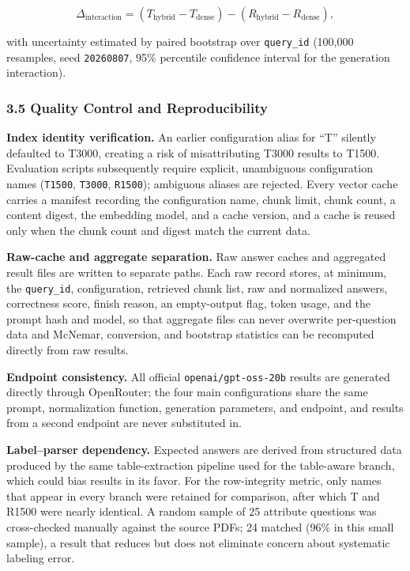\documentclass[11pt,a4paper]{article}
\begin{document}
\[
\Delta_{\text{interaction}}=
(T_{\text{hybrid}}-T_{\text{dense}})-(R_{\text{hybrid}}-R_{\text{dense}}),
\]

with uncertainty estimated by paired bootstrap over \texttt{query\_id}
(100,000 resamples, seed \texttt{20260807}, 95\% percentile confidence
interval for the generation interaction).

\subsubsection{3.5 Quality Control and Reproducibility}

\textbf{Index identity verification.} An earlier configuration alias for
``T'' silently defaulted to T3000, creating a risk of misattributing T3000
results to T1500. Evaluation scripts subsequently require explicit,
unambiguous configuration names (\texttt{T1500}, \texttt{T3000},
\texttt{R1500}); ambiguous aliases are rejected. Every vector cache carries a
manifest recording the configuration name, chunk limit, chunk count, a
content digest, the embedding model, and a cache version, and a cache is
reused only when the chunk count and digest match the current data.

\textbf{Raw-cache and aggregate separation.} Raw answer caches and
aggregated result files are written to separate paths. Each raw record
stores, at minimum, the \texttt{query\_id}, configuration, retrieved chunk
list, raw and normalized answers, correctness score, finish reason, an
empty-output flag, token usage, and the prompt hash and model, so that
aggregate files can never overwrite per-question data and McNemar,
conversion, and bootstrap statistics can be recomputed directly from raw
results.

\textbf{Endpoint consistency.} All official \texttt{openai/gpt-oss-20b}
results are generated directly through OpenRouter; the four main
configurations share the same prompt, normalization function, generation
parameters, and endpoint, and results from a second endpoint are never
substituted in.

\textbf{Label--parser dependency.} Expected answers are derived from
structured data produced by the same table-extraction pipeline used for the
table-aware branch, which could bias results in its favor. For the
row-integrity metric, only names that appear in every branch were retained
for comparison, after which T and R1500 were nearly identical. A random
sample of 25 attribute questions was cross-checked manually against the
source PDFs; 24 matched (96\% in this small sample), a result that reduces
but does not eliminate concern about systematic labeling error.
\end{document}

